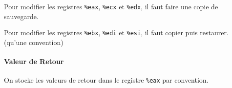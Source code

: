 Pour modifier les registres \texttt{\%eax}, \texttt{\%ecx} et
\texttt{\%edx}, il faut faire une copie de sauvegarde.

Pour modifier les registres \texttt{\%ebx}, \texttt{\%edi} et
\texttt{\%esi}, il faut copier puis restaurer. (qu'une convention)

\paragraph{Valeur de Retour}\label{valeur-de-retour}

On stocke les valeurs de retour dans le registre \texttt{\%eax} par
convention.

